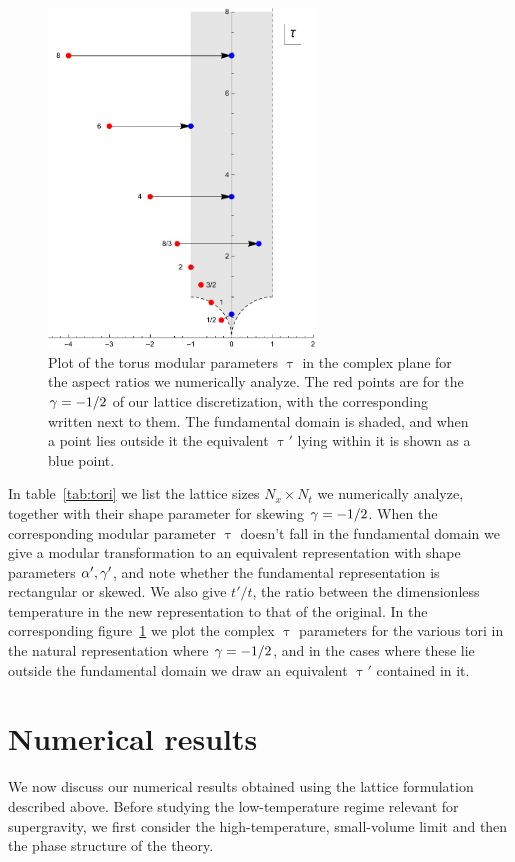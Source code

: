 \begin{figure}[htbp]
  \centering
  \includegraphics[height=9cm]{Figures/tauplot.pdf}
  \caption{\label{fig:tauplot}Plot of the torus modular parameters $\uptau$ in the complex plane for the aspect ratios \al we numerically analyze.  The red points are for the $\gamma = -1 / 2$ of our lattice discretization, with the corresponding \al written next to them.  The fundamental domain is shaded, and when a point lies outside it the equivalent $\uptau'$ lying within it is shown as a blue point.}
\end{figure}

In table~\ref{tab:tori} we list the lattice sizes $N_x \times N_t$ we numerically analyze, together with their shape parameter \al for skewing $\gamma = -1 / 2$.
When the corresponding modular parameter $\uptau$ doesn't fall in the fundamental domain we give a modular transformation to an equivalent representation with shape parameters $\alpha', \gamma'$, and note whether the fundamental representation is rectangular or skewed.
We also give $t' / t$, the ratio between the dimensionless temperature in the new representation to that of the original.
In the corresponding figure~\ref{fig:tauplot} we plot the complex $\uptau$ parameters for the various tori in the natural representation where $\gamma = -1 / 2$, and in the cases where these lie outside the fundamental domain we draw an equivalent $\uptau'$ contained in it.

\section{\label{sec:results}Numerical results}
We now discuss our numerical results obtained using the lattice formulation described above.
Before studying the low-temperature regime relevant for supergravity, we first consider the high-temperature, small-volume limit and then the phase structure of the theory.

